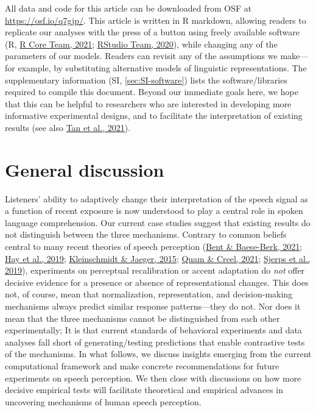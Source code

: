 \documentclass[
  11pt,
  english,
  man,floatsintext]{apa6}
\begin{document}
All data and code for this article can be downloaded from OSF at \url{https://osf.io/q7gjp/}. This article is written in R markdown, allowing readers to replicate our analyses with the press of a button using freely available software (R, \protect\hyperlink{ref-R}{R Core Team, 2021}; \protect\hyperlink{ref-RStudio}{RStudio Team, 2020}), while changing any of the parameters of our models. Readers can revisit any of the assumptions we make---for example, by substituting alternative models of linguistic representations. The supplementary information (SI, \ref{sec:SI-software}) lists the software/libraries required to compile this document. Beyond our immediate goals here, we hope that this can be helpful to researchers who are interested in developing more informative experimental designs, and to facilitate the interpretation of existing results (see also \protect\hyperlink{ref-tan2021}{Tan et al., 2021}).

\hypertarget{general-discussion}{%
\section{General discussion}\label{general-discussion}}

Listeners' ability to adaptively change their interpretation of the speech signal as a function of recent exposure is now understood to play a central role in spoken language comprehension. Our current case studies suggest that existing results do not distinguish between the three mechanisms. Contrary to common beliefs central to many recent theories of speech perception (\protect\hyperlink{ref-bent-baeseberk2021}{Bent \& Baese-Berk, 2021}; \protect\hyperlink{ref-hay2019}{Hay et al., 2019}; \protect\hyperlink{ref-kleinschmidt-jaeger2015}{Kleinschmidt \& Jaeger, 2015}; \protect\hyperlink{ref-quam-creel2021}{Quam \& Creel, 2021}; \protect\hyperlink{ref-sjerps2019}{Sjerps et al., 2019}), experiments on perceptual recalibration or accent adaptation do \emph{not} offer decisive evidence for a presence or absence of representational changes. This does not, of course, mean that normalization, representation, and decision-making mechanisms always predict similar response patterns---they do not. Nor does it mean that the three mechanisms cannot be distinguished from each other experimentally; It is that current standards of behavioral experiments and data analyses fall short of generating/testing predictions that enable contrastive tests of the mechanisms. In what follows, we discuss insights emerging from the current computational framework and make concrete recommendations for future experiments on speech perception. We then close with discussions on how more decisive empirical tests will facilitate theoretical and empirical advances in uncovering mechanisms of human speech perception.
\end{document}
